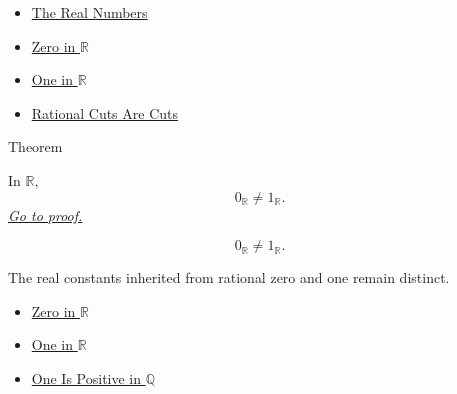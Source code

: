 \begin{dependencies}
\begin{itemize}
  \item
 \hyperref[def:reals]{The Real Numbers}
  \item \hyperref[def:zero-in-r]{Zero in $\mathbb{R}$}
  \item \hyperref[def:one-in-r]{One in $\mathbb{R}$}
  \item \hyperref[lem:rational-cut-is-a-cut]{Rational Cuts Are Cuts}
\end{itemize}
\end{dependencies}

\begin{theorembox}{Theorem}
\begin{theorem}
\label{thm:zero-not-one-in-r}
In $\mathbb{R}$,
\[
0_{\mathbb{R}}\ne 1_{\mathbb{R}}.
\]
\hyperref[prf:zero-not-one-in-r]{\textit{Go to proof.}}
\end{theorem}
\end{theorembox}

\begin{remark*}
\[
0_{\mathbb{R}}\ne 1_{\mathbb{R}}.
\]
\end{remark*}

\begin{remark*}[Interpretation]
The real constants inherited from rational zero and one remain distinct.
\end{remark*}

\begin{dependencies}
\begin{itemize}
  \item \hyperref[def:zero-in-r]{Zero in $\mathbb{R}$}
  \item \hyperref[def:one-in-r]{One in $\mathbb{R}$}
  \item \hyperref[cor:one-positive-on-q]{One Is Positive in $\mathbb{Q}$}
\end{itemize}
\end{dependencies}
